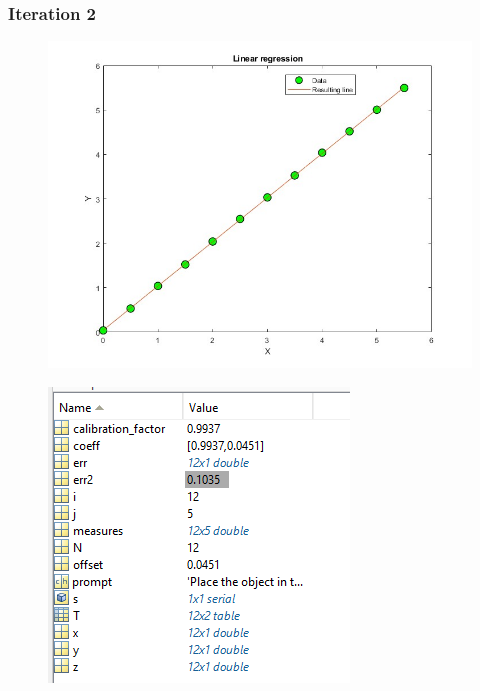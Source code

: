 \subsubsection{Iteration 2}

\begin{figure}[ht]
\centering
\begin{minipage}{.6\textwidth} %
  \centering
  \includegraphics[width=.9\linewidth]{medias/test/calibration/figure_2.jpg}
  \label{fig:test5}
\end{minipage}%
\begin{minipage}{.4\textwidth} %
  \centering
  \includegraphics[width=.9\linewidth]{medias/test/calibration/workspace_2.png}
  \label{fig:test6}
\end{minipage}
\end{figure}

